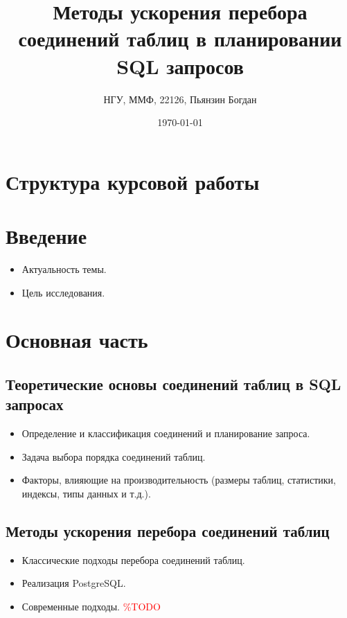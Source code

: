 \documentclass[12pt]{article}
\title{Методы ускорения перебора соединений таблиц в планировании SQL запросов}
\author{НГУ, ММФ, 22126, Пьянзин Богдан}
\date{\today}
\begin{document}
\begin{flushleft}
\maketitle

\newpage


\section*{Структура курсовой работы}  %

\section{Введение}
\begin{itemize}
    \item Актуальность темы.
    \item Цель исследования.
\end{itemize}

\section{Основная часть}

\subsection{Теоретические основы соединений таблиц в SQL запросах}
\begin{itemize}
    \item Определение и классификация соединений и планирование запроса.
    \item Задача выбора порядка соединений таблиц.
    \item Факторы, влияющие на производительность (размеры таблиц, статистики, индексы, типы данных и т.д.).
\end{itemize}

\subsection{Методы ускорения перебора соединений таблиц}
\begin{itemize}
    \item Классические подходы перебора соединений таблиц.
    \item Реализация PostgreSQL.
    \item Современные подходы. \textcolor{red}{\%TODO}
\end{itemize}


\end{flushleft}
\end{document}
